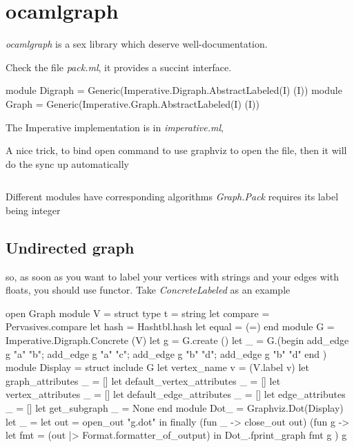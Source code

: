 \section{ocamlgraph}
\label{sec:ocamlgraph}

\textit{ocamlgraph} is a sex library which deserve well-documentation.

Check the file \textit{pack.ml}, it provides a succint interface.

\begin{ocamlcode}
  module Digraph = Generic(Imperative.Digraph.AbstractLabeled(I) (I))
  module Graph = Generic(Imperative.Graph.AbstractLabeled(I) (I))
\end{ocamlcode}

The Imperative implementation is in \textit{imperative.ml}, 

A nice trick, to bind open command to use graphviz to open the file,
then it will do the sync up automatically

\inputminted[fontsize=\scriptsize
]{ocaml}{code/graph/dag.ml}

Different modules have corresponding algorithms
\textit{Graph.Pack} requires its label being integer 



\subsection{Undirected graph}
\label{sec:undirected-graph}

so, as soon as you want to label your vertices with strings and your
edges with floats, you should use functor. Take
\textit{ConcreteLabeled} as an example


  \begin{ocamlcode}
open Graph 
module V = struct
  type t = string
  let compare = Pervasives.compare
  let hash = Hashtbl.hash
  let equal = (=)
end
module G = Imperative.Digraph.Concrete (V)
let g = G.create ()
let _ = G.(begin 
  add_edge g "a" "b";
  add_edge g "a" "c";
  add_edge g "b" "d";
  add_edge g "b" "d"
end )
module Display = struct 
  include G
  let vertex_name v = (V.label v)
  let graph_attributes _ = []
  let default_vertex_attributes _ = []
  let vertex_attributes _ = []
  let default_edge_attributes _ = []
  let edge_attributes _ = []
  let get_subgraph _ = None
end 
module Dot_ = Graphviz.Dot(Display)
let _ = 
  let out = open_out "g.dot" in
  finally (fun _ -> close_out out) (fun g -> 
    let fmt =
      (out |> Format.formatter_of_output) in 
    Dot_.fprint_graph fmt g ) g
  \end{ocamlcode}
  
